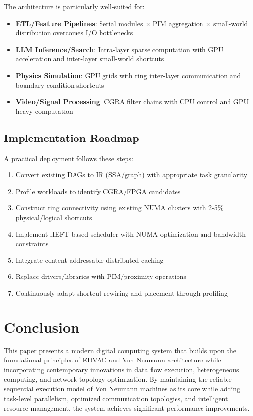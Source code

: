 \documentclass[11pt,a4paper]{article}
\begin{document}
The architecture is particularly well-suited for:

\begin{itemize}
\item \textbf{ETL/Feature Pipelines}: Serial modules $\times$ PIM aggregation $\times$ small-world distribution overcomes I/O bottlenecks
\item \textbf{LLM Inference/Search}: Intra-layer sparse computation with GPU acceleration and inter-layer small-world shortcuts
\item \textbf{Physics Simulation}: GPU grids with ring inter-layer communication and boundary condition shortcuts
\item \textbf{Video/Signal Processing}: CGRA filter chains with CPU control and GPU heavy computation
\end{itemize}

\subsection{Implementation Roadmap}

A practical deployment follows these steps:

\begin{enumerate}
\item Convert existing DAGs to IR (SSA/graph) with appropriate task granularity
\item Profile workloads to identify CGRA/FPGA candidates
\item Construct ring connectivity using existing NUMA clusters with 2-5\% physical/logical shortcuts
\item Implement HEFT-based scheduler with NUMA optimization and bandwidth constraints
\item Integrate content-addressable distributed caching
\item Replace drivers/libraries with PIM/proximity operations
\item Continuously adapt shortcut rewiring and placement through profiling
\end{enumerate}

\section{Conclusion}
\label{sec:conclusion}

This paper presents a modern digital computing system that builds upon the foundational principles of EDVAC and Von Neumann architecture while incorporating contemporary innovations in data flow execution, heterogeneous computing, and network topology optimization. By maintaining the reliable sequential execution model of Von Neumann machines as its core while adding task-level parallelism, optimized communication topologies, and intelligent resource management, the system achieves significant performance improvements.
\end{document}
